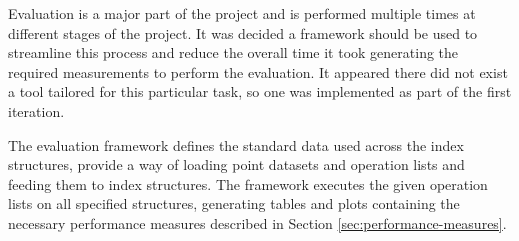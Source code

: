 Evaluation is a major part of the project and is performed multiple times at different stages of the project. It was decided a framework should be used to streamline this process and reduce the overall time it took generating the required measurements to perform the evaluation. It appeared there did not exist a tool tailored for this particular task, so one was implemented as part of the first iteration.

The evaluation framework defines the standard data used across the index structures, provide a way of loading point datasets and operation lists and feeding them to index structures. The framework executes the given operation lists on all specified structures, generating tables and plots containing the necessary performance measures described in Section \ref{sec:performance-measures}.

